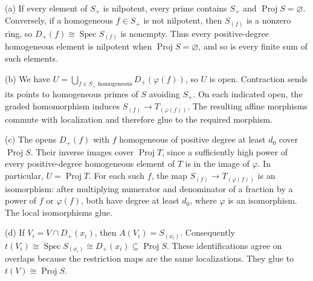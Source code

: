 (a) If every element of $S_+$ is nilpotent, every prime contains $S_+$ and $\operatorname{Proj}S=\varnothing$. Conversely, if a homogeneous $f\in S_+$ is not nilpotent, then $S_{(f)}$ is a nonzero ring, so $D_+(f)\cong\operatorname{Spec}S_{(f)}$ is nonempty. Thus every positive-degree homogeneous element is nilpotent when $\operatorname{Proj}S=\varnothing$, and so is every finite sum of such elements.

(b) We have $U=\bigcup_{f\in S_+\text{ homogeneous}}D_+(\varphi(f))$, so $U$ is open. Contraction sends its points to homogeneous primes of $S$ avoiding $S_+$. On each indicated open, the graded homomorphism induces $S_{(f)}\to T_{(\varphi(f))}$. The resulting affine morphisms commute with localization and therefore glue to the required morphism.

(c) The opens $D_+(f)$ with $f$ homogeneous of positive degree at least $d_0$ cover $\operatorname{Proj}S$. Their inverse images cover $\operatorname{Proj}T$, since a sufficiently high power of every positive-degree homogeneous element of $T$ is in the image of $\varphi$. In particular, $U=\operatorname{Proj}T$. For each such $f$, the map $S_{(f)}\to T_{(\varphi(f))}$ is an isomorphism: after multiplying numerator and denominator of a fraction by a power of $f$ or $\varphi(f)$, both have degree at least $d_0$, where $\varphi$ is an isomorphism. The local isomorphisms glue.

(d) If $V_i=V\cap D_+(x_i)$, then $A(V_i)=S_{(x_i)}$. Consequently $t(V_i)\cong\operatorname{Spec}S_{(x_i)}\cong D_+(x_i)\subseteq\operatorname{Proj}S$. These identifications agree on overlaps because the restriction maps are the same localizations. They glue to $t(V)\cong\operatorname{Proj}S$.
